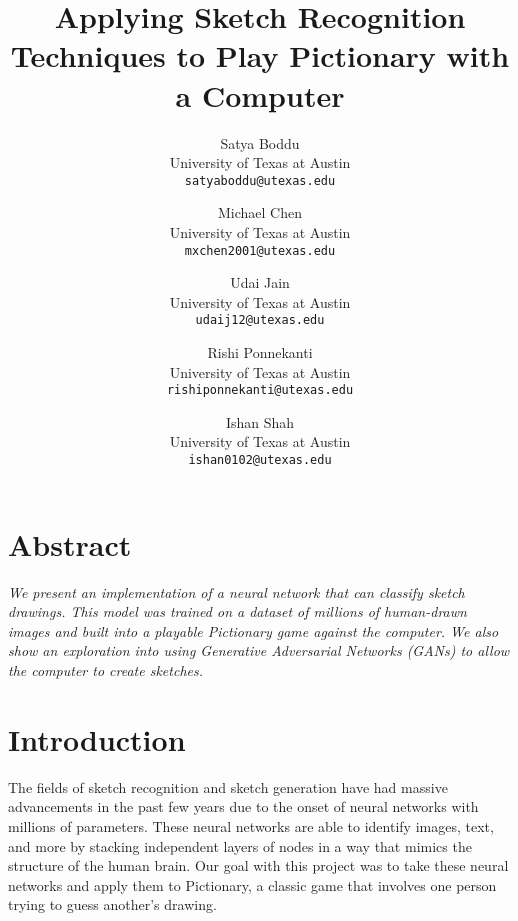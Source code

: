 \documentclass[10pt,twocolumn,letterpaper]{article}
\begin{document}
\title{Applying Sketch Recognition Techniques to Play Pictionary with a Computer}

\author{Satya Boddu\\
University of Texas at Austin\\
{\tt\small satyaboddu@utexas.edu}
\and
Michael Chen\\
University of Texas at Austin\\
{\tt\small mxchen2001@utexas.edu}
\and
Udai Jain\\
University of Texas at Austin\\
{\tt\small udaij12@utexas.edu}
\and
Rishi Ponnekanti\\
University of Texas at Austin\\
{\tt\small rishiponnekanti@utexas.edu}
\and
Ishan Shah\\
University of Texas at Austin\\
{\tt\small ishan0102@utexas.edu}
}

\maketitle

{\centering \section*{Abstract}}

\emph{We present an implementation of a neural network that can classify sketch drawings. This model was trained on a dataset of millions of human-drawn images and built into a playable Pictionary game against the computer. We also show an exploration into using Generative Adversarial Networks (GANs) to allow the computer to create sketches.} \vspace{1em}

\section{Introduction}

The fields of sketch recognition and sketch generation have had massive advancements in the past few years due to the onset of neural networks with millions of parameters. These neural networks are able to identify images, text, and more by stacking independent layers of nodes in a way that mimics the structure of the human brain. Our goal with this project was to take these neural networks and apply them to Pictionary, a classic game that involves one person trying to guess another’s drawing.
\end{document}
